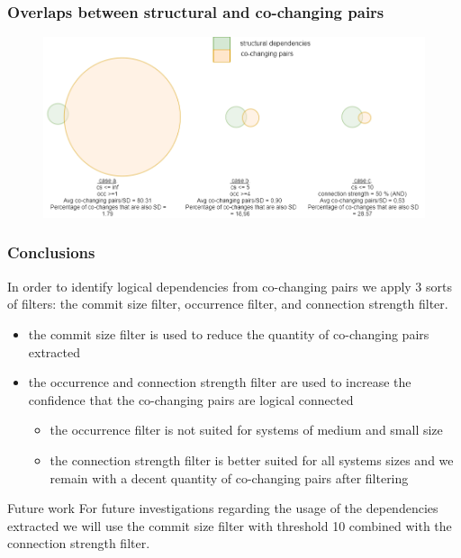 \documentclass{beamer}
\begin{document}
 \begin{frame}
\frametitle{Overlaps between structural and co-changing pairs}

\begin{center}
     \begin{figure}
	\includegraphics[scale=0.35]{figvenn_OVERLAPP.png}
     \end{figure}
\end{center}

\end{frame}



 \begin{frame}
\frametitle{Conclusions}
In order to identify logical dependencies from co-changing pairs we apply 3 sorts of filters: the commit size filter, occurrence filter, and connection strength filter. 
 \begin{itemize}
        \item  the commit size filter is used to reduce the quantity of co-changing pairs extracted
        \item  the occurrence and connection strength filter are used to increase the confidence that the co-changing pairs are logical connected
	\begin{itemize}   
        \item  the occurrence filter is not suited for systems of medium and small size
	\item  the connection strength filter is better suited for all systems sizes and we remain with a decent quantity of co-changing pairs after filtering
    	\end{itemize}
    \end{itemize}
\begin{block}{Future work}
For future investigations regarding the usage of the dependencies extracted we will use the commit size filter with threshold 10 combined with the connection strength filter.
\end{block}
\end{frame}
\end{document}
